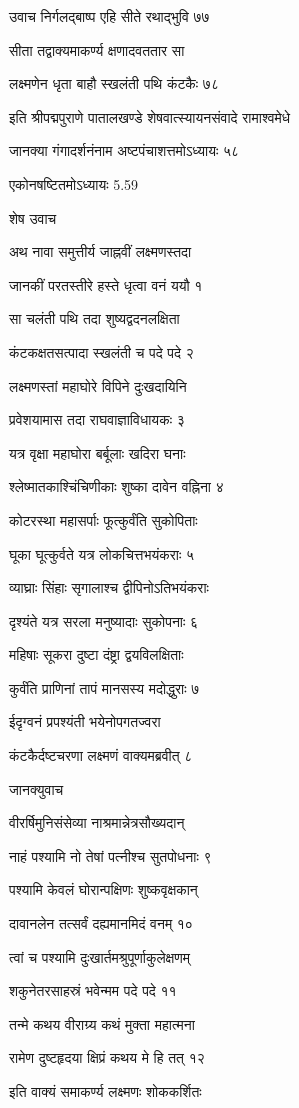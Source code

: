 उवाच निर्गलद्बाष्प एहि सीते रथाद्भुवि ७७

सीता तद्वाक्यमाकर्ण्य क्षणादवततार सा

लक्ष्मणेन धृता बाहौ स्खलंती पथि कंटकैः ७८

इति श्रीपद्मपुराणे पातालखण्डे शेषवात्स्यायनसंवादे रामाश्वमेधे

जानक्या गंगादर्शनंनाम अष्टपंचाशत्तमोऽध्यायः ५८

एकोनषष्टितमोऽध्यायः 5.59

शेष उवाच

अथ नावा समुत्तीर्य जाह्नवीं लक्ष्मणस्तदा

जानकीं परतस्तीरे हस्ते धृत्वा वनं ययौ १

सा चलंती पथि तदा शुष्यद्वदनलक्षिता

कंटकक्षतसत्पादा स्खलंती च पदे पदे २

लक्ष्मणस्तां महाघोरे विपिने दुःखदायिनि

प्रवेशयामास तदा राघवाज्ञाविधायकः ३

यत्र वृक्षा महाघोरा बर्बूलाः खदिरा घनाः

श्लेष्मातकाश्चिंचिणीकाः शुष्का दावेन वह्निना ४

कोटरस्था महासर्पाः फूत्कुर्वंति सुकोपिताः

घूका घूत्कुर्वते यत्र लोकचित्तभयंकराः ५

व्याघ्राः सिंहाः सृगालाश्च द्वीपिनोऽतिभयंकराः

दृश्यंते यत्र सरला मनुष्यादाः सुकोपनाः ६

महिषाः सूकरा दुष्टा दंष्ट्रा द्वयविलक्षिताः

कुर्वंति प्राणिनां तापं मानसस्य मदोद्धुराः ७

ईदृग्वनं प्रपश्यंती भयेनोपगतज्वरा

कंटकैर्दष्टचरणा लक्ष्मणं वाक्यमब्रवीत् ८

जानक्युवाच

वीरर्षिमुनिसंसेव्या नाश्रमान्नेत्रसौख्यदान्

नाहं पश्यामि नो तेषां पत्नीश्च सुतपोधनाः ९

पश्यामि केवलं घोरान्पक्षिणः शुष्कवृक्षकान्

दावानलेन तत्सर्वं दह्यमानमिदं वनम् १०

त्वां च पश्यामि दुःखार्तमश्रुपूर्णाकुलेक्षणम्

शकुनेतरसाहस्रं भवेन्मम पदे पदे ११

तन्मे कथय वीराग्र्य कथं मुक्ता महात्मना

रामेण दुष्टहृदया क्षिप्रं कथय मे हि तत् १२

इति वाक्यं समाकर्ण्य लक्ष्मणः शोककर्शितः

